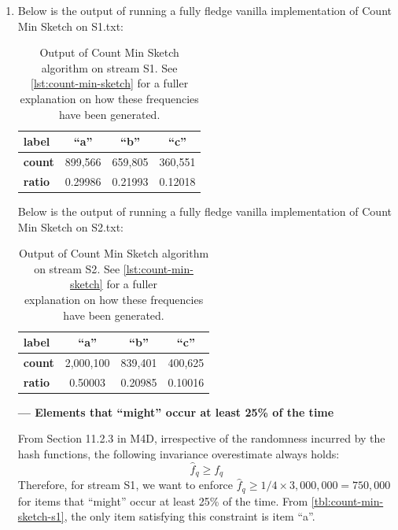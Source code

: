 \documentclass{article}
\begin{document}
\begin{enumerate}[leftmargin={*}, font={\bf}, label={\arabic*.}, ref={\arabic*}]
\begin{enumerate}[label={(\Alph*)}, ref={\theenumi(\Alph*)}]
      \item \label{qst:1B}
        Below is the output of running a fully fledge vanilla implementation of
        {\sf Count Min Sketch} on {\sf S1.txt}:
        \begin{table}[H]
          \centering
          \begin{tabular}{|l|c|c|c|}
            \hline
            {\sf\bfseries label} & {\sf ``a''} & {\sf ``b''} & {\sf ``c''} \\ \hline
            {\sf\bfseries count} & 899,566 & 659,805 & 360,551 \\ \hline
            {\sf\bfseries ratio} & 0.29986 & 0.21993 & 0.12018 \\ \hline
          \end{tabular}
          \caption{
            Output of {\sf Count Min Sketch} algorithm on stream {\sf S1}. See
            \autoref{lst:count-min-sketch} for a fuller \\ explanation on how
            these frequencies have been generated.
          }
          \label{tbl:count-min-sketch-s1}
        \end{table}

        Below is the output of running a fully fledge vanilla implementation of
        {\sf Count Min Sketch} on {\sf S2.txt}:
        \begin{table}[H]
          \centering
          \begin{tabular}{|l|c|c|c|}
            \hline
            {\sf\bfseries label} & {\sf ``a''} & {\sf ``b''} & {\sf ``c''} \\ \hline
            {\sf\bfseries count} & 2,000,100 & 839,401 & 400,625 \\ \hline
            {\sf\bfseries ratio} & 0.50003 & 0.20985 & 0.10016 \\ \hline
          \end{tabular}
          \caption{
            Output of {\sf Count Min Sketch} algorithm on stream {\sf S2}. See
            \autoref{lst:count-min-sketch} for a fuller \\ explanation on how
            these frequencies have been generated.
          }
          \label{tbl:count-min-sketch-s2}
        \end{table}

        {\bf\sffamily --- Elements that ``might'' occur at least 25\% of the time} \par
        
        From Section 11.2.3 in M4D, irrespective of the randomness incurred by the hash
        functions, the following invariance overestimate always holds:
        \[
          \hat{f}_q \geq f_q
        \]
        Therefore, for stream {\sf S1},  we want to enforce $\hat{f}_q \geq 1/4 \times
        3,000,000 = 750,000$ for items that ``might'' occur at least 25\% of the time.
        From \autoref{tbl:count-min-sketch-s1}, the only item satisfying this constraint
        is item {\sf ``a''}. \\


\end{enumerate}
\end{enumerate}
\end{document}
